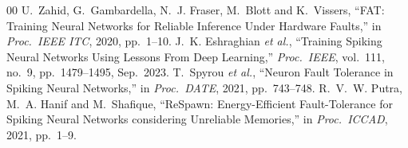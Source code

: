 \documentclass[conference]{IEEEtran}
\begin{document}
\begin{thebibliography}{00}
U.~Zahid, G.~Gambardella, N.~J. Fraser, M.~Blott and K.~Vissers,
``FAT: Training Neural Networks for Reliable Inference Under Hardware Faults,''
in \emph{Proc.\ IEEE ITC}, 2020, pp.~1--10.
J.~K. Eshraghian \textit{et al.},
``Training Spiking Neural Networks Using Lessons From Deep Learning,''
\emph{Proc.\ IEEE}, vol.~111, no.~9, pp.~1479--1495, Sep.~2023.
T.~Spyrou \textit{et al.},
``Neuron Fault Tolerance in Spiking Neural Networks,''
in \emph{Proc.\ DATE}, 2021, pp.~743--748.
R.~V.~W. Putra, M.~A. Hanif and M.~Shafique,
``ReSpawn: Energy-Efficient Fault-Tolerance for Spiking Neural Networks considering Unreliable Memories,''
in \emph{Proc.\ ICCAD}, 2021, pp.~1--9.
\end{thebibliography}
\end{document}
